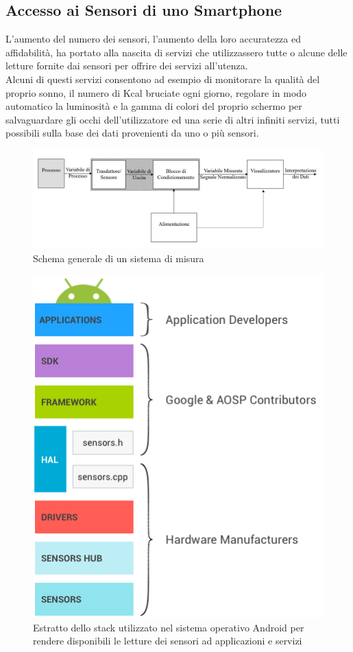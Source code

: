 \subsection{Accesso ai Sensori di uno Smartphone}
L'aumento del numero dei sensori, l'aumento della loro accuratezza ed affidabilità, ha portato alla nascita di servizi che utilizzassero tutte o alcune delle letture fornite dai sensori per offrire dei servizi all'utenza.\\
Alcuni di questi servizi consentono ad esempio di monitorare la qualità del proprio sonno, il numero di Kcal bruciate ogni giorno, regolare in modo automatico la luminosità e la gamma di colori del proprio schermo per salvaguardare gli occhi dell'utilizzatore ed una serie di altri infiniti servizi, tutti possibili sulla base dei dati provenienti da uno o più sensori.\\
\begin{figure}
	\begin{center}
		\includegraphics[width=0.9\columnwidth]{images/attivissimo}
	\end{center}
	\caption{Schema generale di un sistema di misura}
	\label{fig:attivissimo}
\end{figure}
\begin{figure}
	\begin{center}
		\includegraphics[width=0.55\columnwidth]{images/android_sensors}
	\end{center}
	\caption{Estratto dello stack utilizzato nel sistema operativo Android per rendere disponibili le letture dei sensori ad applicazioni e servizi}
	\label{fig:android_sensors}
\end{figure}
